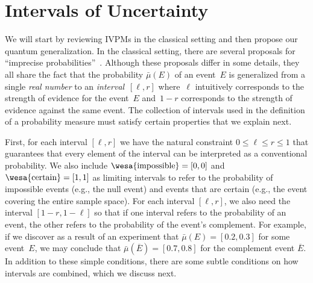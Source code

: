 \documentclass[english,reprint, aps, prl,superscriptaddress, showpacs,
showkeys, longbibliography, amsmath, amssymb]{revtex4-1}
\theoremstyle{plain}
\theoremstyle{definition}
\newcommand{\imposs}{{\text{\wesa{impossible}}}}
\newcommand{\necess}{{\text{\wesa{certain}}}}
\begin{document}
\section{Intervals of Uncertainty}
\label{sec:Interval-Uncertainty}

We will start by reviewing IVPMs in the classical setting and then
propose our quantum generalization. In the classical setting, there
are several proposals for ``imprecise
probabilities''~\citep{Dempster1967,Shafer1976,GilboaSchmeidler1994,Marinacci1999,Weichselberger2000,JamisonLodwick2004,HuberRonchetti2009,Grabisch2016}.
Although these proposals differ in some details, they all share the
fact that the probability $\bar{\mu}(E)$ of an event~$E$ is generalized from
a single \emph{real number} to an \emph{interval}~$[\ell,r]$
where~$\ell$ intuitively corresponds to the strength of evidence for
the event~$E$ and~$1-r$ corresponds to the strength of evidence
against the same event. The collection of intervals used in the
definition of a probability measure must satisfy certain properties
that we explain next.

First, for each interval $[\ell,r]$ we have the natural constraint
$0 \leq \ell \leq r \leq 1$ that guarantees that every element of the
interval can be interpreted as a conventional probability. We also
include $\imposs=[0,0]$ and $\necess=[1,1]$ as limiting intervals to
refer to the probability of impossible events (e.g., the null event)
and events that are certain (e.g., the event covering the entire
sample space).  For each interval $[\ell,r]$, we also need the
interval $[1-r,1-\ell]$ so that if one interval refers to the
probability of an event, the other refers to the probability of the
event's complement.  For example, if we discover as a result of an
experiment that $\bar{\mu}(E) = [0.2,0.3]$ for some event~$E$, we may
conclude that $\bar{\mu}(\overline{E}) = [0.7,0.8]$ for the complement event
$\overline{E}$. In addition to these simple conditions, there are some
subtle conditions on how intervals are combined, which we discuss
next.
\end{document}

